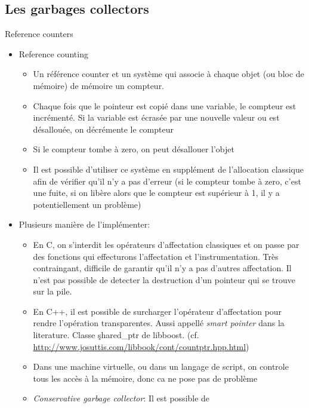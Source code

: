 \subsection{Les garbages collectors}

\begin{frame}[fragile=singleslide]{Reference counters}
  \begin{itemize} 
  \item Reference counting
    \begin{itemize} 
    \item  Un référence  counter et  un système  qui associe  à chaque
      objet (ou bloc de mémoire) de mémoire un compteur.
    \item Chaque fois que le  pointeur est copié dans une variable, le
      compteur  est incrémenté.  Si la  variable est  écrasée  par une
      nouvelle valeur ou est désallouée, on décrémente le compteur
    \item Si le compteur tombe à zero, on peut désallouer l'objet
    \item  Il est  possible  d'utiliser ce  système  en supplément  de
      l'allocation classique afin de vérifier qu'il n'y a pas d'erreur
      (si  le compteur tombe  à zero,  c'est une  fuite, si  on libère
      alors que le compteur est  supérieur à 1, il y a potentiellement
      un problème)
    \end{itemize} 
  \item Plusieurs manière de l'implémenter:
    \begin{itemize}
    \item En C, on  s'interdit les opérateurs d'affectation classiques
      et on  passe par des fonctions qui  effecturons l'affectation et
      l'instrumentation.  Très  contraingant,  difficile  de  garantir
      qu'il n'y a  pas d'autres affectation. Il n'est  pas possible de
      detecter la destruction d'un pointeur qui se trouve sur la pile.
    \item  En   C++,  il   est  possible  de   surcharger  l'opérateur
      d'affectation  pour  rendre  l'opération  transparentes.   Aussi
      appellé  \emph{smart   pointer}  dans  la   literature.   Classe
      \c{shared_ptr}            de            libboost.           (cf.
      \url{http://www.josuttis.com/libbook/cont/countptr.hpp.html})
    \item Dans une machine virtuelle, ou dans un langage de script, on
      controle tous  les accès à  la mémoire, donc  ca ne pose  pas de
      problème
    \item  \emph{Conservative garbage collector}:  Il est  possible de

\end{itemize}
\end{itemize}
\end{frame}
